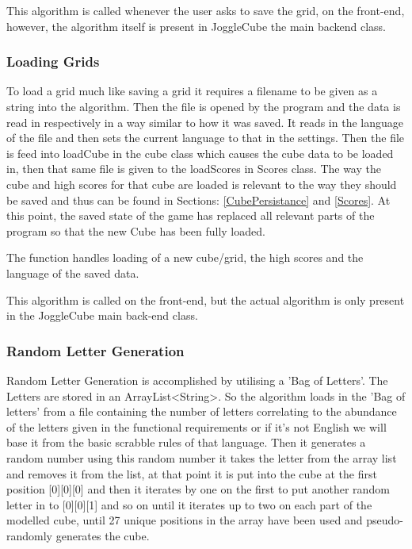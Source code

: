     This algorithm is called whenever the user asks to save the grid, on the front-end, however, the algorithm itself is present in JoggleCube the main backend class.
    \subsubsection{Loading Grids} \label{LoadGrid}
    To load a grid much like saving a grid it requires a filename to be given as a string into the algorithm. Then the file is opened by the program and the data is read in respectively in a way similar to how it was saved. It reads in the language of the file and then sets the current language to that in the settings. Then the file is feed into loadCube in the cube class which causes the cube data to be loaded in, then that same file is given to the loadScores in Scores class. The way the cube and high scores for that cube are loaded is relevant to the way they should be saved and thus can be found in Sections: \ref{CubePersistance} and \ref{Scores}. At this point, the saved state of the game has replaced all relevant parts of the program so that the new Cube has been fully loaded.
    
    The function handles loading of a new cube/grid, the high scores and the language of the saved data.
    
    This algorithm is called on the front-end, but the actual algorithm is only present in the JoggleCube main back-end class.
    \subsubsection{Random Letter Generation}\label{RandomLetter}
    Random Letter Generation is accomplished by utilising a 'Bag of Letters'. The Letters are stored in an ArrayList<String>. So the algorithm loads in the 'Bag of letters' from a file containing the number of letters correlating to the abundance of the letters given in the functional requirements or if it's not English we will base it from the basic scrabble rules of that language. Then it generates a random number using this random number it takes the letter from the array list and removes it from the list, at that point it is put into the cube at the first position [0][0][0] and then it iterates by one on the first to put another random letter in to [0][0][1] and so on until it iterates up to two on each part of the modelled cube, until 27 unique positions in the array have been used and pseudo-randomly generates the cube.
    
